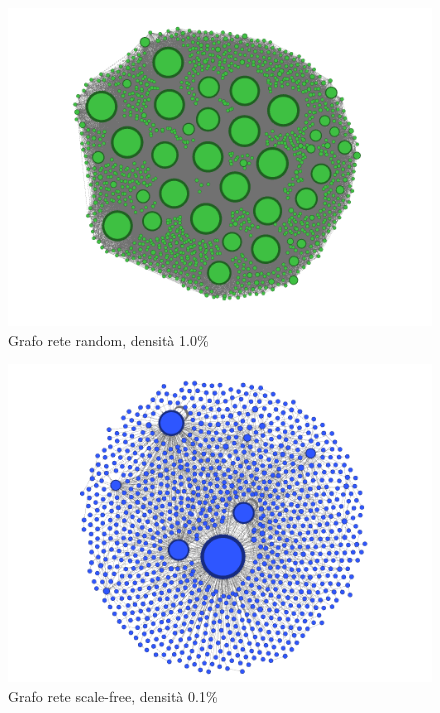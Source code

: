 \documentclass[a4paper,12pt]{article}
\begin{document}
\begin{figure}[H]
\centering
\includegraphics[scale=0.4]{images/init_1000_rnd_1080_1_0.png}
\caption{Grafo rete random, densità 1.0\%}
\label{fig:grnd}
\end{figure}
\begin{figure}[H]
\centering
\includegraphics[scale=0.4]{images/init_1000_sf_1080_0.png}
\caption{Grafo rete scale-free, densità 0.1\%}
\label{fig:gsf}
\end{figure}
\end{document}
